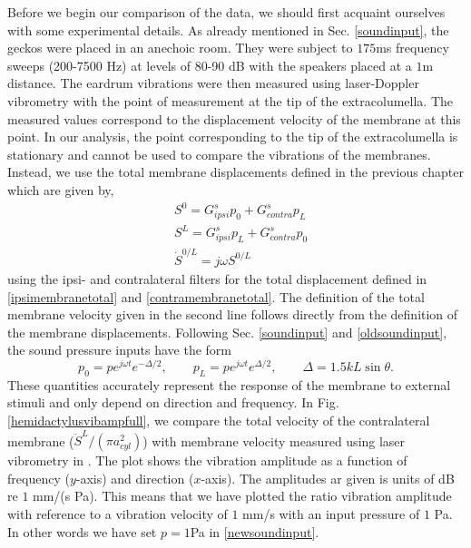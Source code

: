 Before we begin our comparison of the data, we should first acquaint ourselves with some experimental details. As already mentioned in Sec. \ref{soundinput}, the geckos were placed in
an anechoic room. They were subject to $175$ms frequency sweeps (200-7500 Hz) at levels of 80-90 dB with the speakers placed at
a $1$m distance. The eardrum vibrations were then measured using laser-Doppler vibrometry with the point
of measurement at the tip of the extracolumella. The measured values correspond to the displacement velocity of the membrane at this point.  
In our analysis, the point corresponding to the tip of the extracolumella is stationary and cannot be used to compare the vibrations of the membranes. 
Instead, we use the total membrane displacements defined in the previous chapter which are given by,
\begin{align}
 &S^0=G^s_{ipsi}p_0+G^s_{contra} p_L\\
 &S^L=G^s_{ipsi}p_L+G^s_{contra}p_0\\
 &\dot{S}^{0/L}=j\omega S^{0/L}\label{totalvelocity}
\end{align}
using the ipsi- and contralateral filters for the total displacement defined in \eqref{ipsimembranetotal} and \eqref{contramembranetotal}.
The definition of the total membrane velocity given in the second line follows directly from the definition of the membrane displacements. Following Sec. \ref{soundinput}
and \eqref{oldsoundinput}, the sound pressure inputs have the form
\begin{equation}\label{newsoundinput}
 p_0=pe^{j\omega t} e^{-\Delta/2},\qquad p_L=pe^{j\omega t} e^{\Delta/2},\qquad \Delta=1.5kL\sin\theta.
\end{equation}
These quantities accurately
represent the response of the membrane to external stimuli and only depend on direction and frequency. In Fig. \ref{hemidactylusvibampfull},
we compare the total velocity of the contralateral membrane ($\dot{S}^L/(\pi a^2_{cyl})$) with membrane velocity measured using laser vibrometry
in \cite{dalsgaardmanley2}. The plot shows the vibration amplitude as a function of frequency ($y$-axis) and direction ($x$-axis). The amplitudes ar given
is units of dB re $1$ mm/(s Pa). This means that we have plotted the ratio vibration amplitude with reference to a vibration velocity of $1$ mm/s with an input pressure of $1$ Pa.
In other words we have set $p=1$Pa in \eqref{newsoundinput}.
